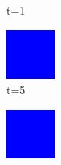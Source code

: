 \documentclass[a4paper, 11pt]{article}
\begin{document}
\begin{figure}[H]
\begin{subfigure}{.16\textwidth}
  \caption{t=1}
\end{subfigure}%
\begin{subfigure}{.16\textwidth}
  \centering
  \includegraphics[width=0.9\linewidth]{PRISONERS_DILEMMA_MOORE_12x12_t05}
  \caption{t=5}
\end{subfigure}%
\begin{subfigure}{.16\textwidth}
  \centering
  \includegraphics[width=0.9\linewidth]{PRISONERS_DILEMMA_MOORE_12x12_t10}

\end{subfigure}
\end{figure}
\end{document}
